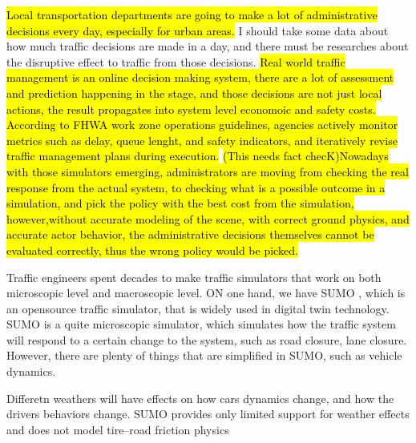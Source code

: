 \hl {Local transportation departments are going to make a lot of administrative decisions every day, especially for urban areas.} I should take some data about how much traffic decisions are made in a day, and there must be researches about the disruptive effect to traffic from those decisions.\hl{ Real world traffic management is an online decision making system, there are a lot of assessment and prediction happening in the stage, and those decisions are not just local actions, the result propagates into system level economoic and safety costs. According to FHWA work zone operations guidelines, agencies actively monitor metrics such as delay, queue lenght, and safety indicators, and iteratively revise traffic management plans during execution. }\cite{fhwa_workzone_2023}\hl{(This needs fact checK)Nowadays with those simulators emerging, administrators are moving from checking the real response from the actual system, to checking what is a possible outcome in a simulation, and pick the policy with the best cost from the simulation, however,without accurate modeling of the scene, with correct ground physics, and accurate actor behavior, the administrative decisions themselves cannot be evaluated correctly, thus the wrong policy would be picked. }
%

Traffic engineers spent decades to make traffic simulators that work on both microscopic level and macroscopic level. ON one hand, we have SUMO \cite{krajzewicz_sumo_2012}, which is an opensource traffic simulator, that is widely used in digital twin technology. SUMO is a quite microscopic simulator, which simulates how the traffic system will respond to a certain change to the system, such as road closure, lane closure. However, there are plenty of things that are simplified in SUMO, such as vehicle dynamics.
%

Differetn weathers will have effects on how cars dynamics change, and how the drivers behaviors change. SUMO provides only limited support for weather effects and does not model tire–road friction physics
%

